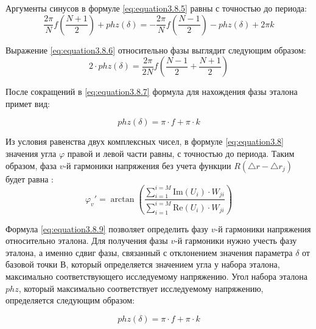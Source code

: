 Аргументы синусов в формуле \ref{eq:equation3.8.5} равны с точностью до периода:
\begin{equation}
	\label{eq:equation3.8.6}
	 {\frac{2 \pi}{N}f \left( \frac{N+1}{2} \right) + phz(\delta)  }  =   - {\frac{2 \pi}{N}f \left( \frac{N-1}{2}\right) - phz(\delta)} + 2 \pi k  	 
\end{equation}

Выражение \ref{eq:equation3.8.6} относительно фазы выглядит следующим образом:
\begin{equation}
\label{eq:equation3.8.7}
2 \cdot phz (\delta) = \frac{2 \pi}{2 N}f \left(\frac{N - 1}{2} + \frac{N + 1}{2} \right)  
\end{equation}

После сокращений в \ref{eq:equation3.8.7} формула для нахождения фазы эталона примет вид:

\begin{equation}
	\label{eq:equation3.8.8}
	 phz (\delta) = \pi \cdot f + \pi \cdot k  
\end{equation}

Из условия равенства двух комплексных чисел, в формуле \ref{eq:equation3.8} значения угла $\varphi$ правой и левой части равны, с точностью до периода. Таким образом, фаза  $v$-й гармоники напряжения без учета функции $R(\bigtriangleup r - \bigtriangleup r_j)$  будет равна \cite{Altman2012definition}:
\begin{equation}
\label{eq:equation3.8.9}
\varphi_{v}'= \arctan \left({\frac{\displaystyle\sum_{i=1}^{i=M} \mathrm{Im}(U_i) \cdot W_{ji}}{\displaystyle\sum_{i=1}^{i=M} \mathrm{Re}(U_i) \cdot W_{ji}}
}\right) 
\end{equation}

Формула \ref{eq:equation3.8.9} позволяет определить фазу  $v$-й гармоники напряжения относительно эталона. Для получения фазы  $v$-й гармоники нужно учесть фазу эталона, а именно сдвиг фазы, связанный с отклонением значения параметра $\delta$ от базовой точки $В$, который определяется значением угла у набора эталона, максимально соответствующего исследуемому напряжению. Угол набора эталона $phz$, который максимально соответствует исследуемому напряжению, определяется следующим образом:

\begin{equation}
	\label{eq:equation3.8.10}
phz(\delta) = \pi \cdot f + \pi \cdot k
\end{equation}

